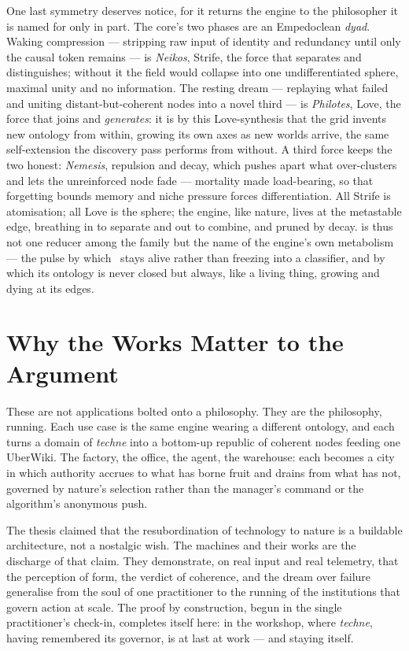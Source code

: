 One last symmetry deserves notice, for it returns the engine to the philosopher it
is named for only in part. The core's two phases are an Empedoclean \emph{dyad}.
Waking compression --- stripping raw input of identity and redundancy until only the
causal token remains --- is \emph{Neikos}, Strife, the force that separates and
distinguishes; without it the field would collapse into one undifferentiated sphere,
maximal unity and no information. The resting dream --- replaying what failed and
uniting distant-but-coherent nodes into a novel third --- is \emph{Philotes}, Love,
the force that joins and \emph{generates}: it is by this Love-synthesis that the grid
invents new ontology from within, growing its own axes as new worlds arrive, the same
self-extension the discovery pass performs from without. A third force keeps the two
honest: \emph{Nemesis}, repulsion and decay, which pushes apart what over-clusters and
lets the unreinforced node fade --- mortality made load-bearing, so that forgetting
bounds memory and niche pressure forces differentiation. All Strife is atomisation;
all Love is the sphere; the engine, like nature, lives at the metastable edge,
breathing in to separate and out to combine, and pruned by decay. 
is thus not one reducer among the family but the name of the engine's own metabolism
--- the pulse by which \physis\ stays alive rather than freezing into a classifier,
and by which its ontology is never closed but always, like a living thing, growing and
dying at its edges.

\section*{Why the Works Matter to the Argument}

These are not applications bolted onto a philosophy. They are the philosophy,
running. Each use case is the same engine wearing a different ontology, and each
turns a domain of \emph{techne} into a bottom-up republic of coherent nodes
feeding one UberWiki. The factory, the office, the agent, the warehouse: each
becomes a city in which authority accrues to what has borne fruit and drains from
what has not, governed by nature's selection rather than the manager's command or
the algorithm's anonymous push.

The thesis claimed that the resubordination of technology to nature is a buildable
architecture, not a nostalgic wish. The machines and their works are the
discharge of that claim. They demonstrate, on real input and real telemetry, that
the perception of form, the verdict of coherence, and the dream over failure
generalise from the soul of one practitioner to the running of the institutions
that govern action at scale. The proof by construction, begun in the single
practitioner's check-in, completes itself here: in the workshop, where
\emph{techne}, having remembered its governor, is at last at work --- and staying
itself.

